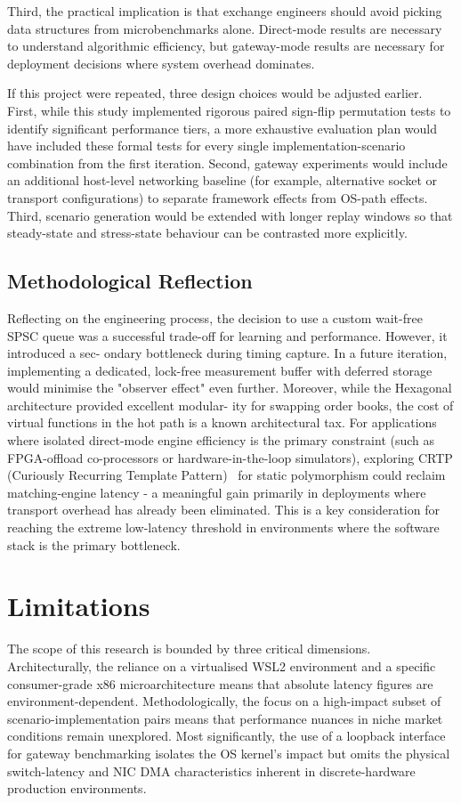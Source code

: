 Third, the practical implication is that exchange engineers should avoid picking
data structures from microbenchmarks alone. Direct-mode results are necessary to
understand algorithmic efficiency, but gateway-mode results are necessary for
deployment decisions where system overhead dominates.

If this project were repeated, three design choices would be adjusted earlier.
First, while this study implemented rigorous paired sign-flip permutation 
tests to identify significant performance tiers, a more exhaustive 
evaluation plan would have included these formal tests for every single 
implementation-scenario combination from the first iteration. 
Second, gateway experiments would include an additional host-level networking
baseline (for example, alternative socket or
transport configurations) to separate framework effects from OS-path effects.
Third, scenario generation would be extended with longer replay windows so that
steady-state and stress-state behaviour can be contrasted more explicitly.

\subsection{Methodological Reflection}
Reflecting on the engineering process, the decision to use a custom wait-free SPSC queue
was a successful trade-off for learning and performance. However, it introduced a sec-
ondary bottleneck during timing capture. In a future iteration, implementing a dedicated,
lock-free measurement buffer with deferred storage would minimise the "observer effect"
even further. Moreover, while the Hexagonal architecture provided excellent modular-
ity for swapping order books, the cost of virtual functions in the hot path is a known
architectural tax. For applications where isolated direct-mode engine 
efficiency is the primary constraint (such as FPGA-offload co-processors or 
hardware-in-the-loop simulators), exploring CRTP (Curiously Recurring Template 
Pattern)~\citep{coplien1995crtp} for static polymorphism could reclaim 
matching-engine latency - a meaningful gain primarily in deployments where 
transport overhead has already been eliminated. This is a key consideration for 
reaching the extreme low-latency threshold in environments where the software 
stack is the primary bottleneck.

\section{Limitations}
The scope of this research is bounded by three critical dimensions. 
Architecturally, the reliance on a virtualised WSL2 environment and a 
specific consumer-grade x86 microarchitecture means that absolute latency 
figures are environment-dependent. Methodologically, the focus on a high-impact 
subset of scenario-implementation pairs means that performance nuances in 
niche market conditions remain unexplored. Most significantly, the use of a 
loopback interface for gateway benchmarking isolates the OS kernel's 
impact but omits the physical switch-latency and NIC DMA characteristics 
inherent in discrete-hardware production environments.

